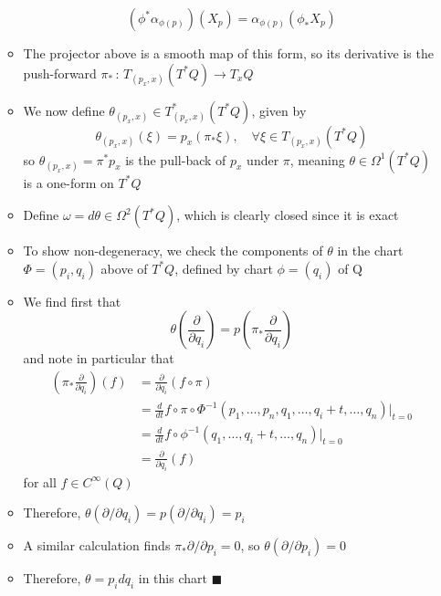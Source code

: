 \documentclass[12pt,a4paper]{article}
\numberwithin{equation}{section}
\begin{document}
\begin{itemize}
\begin{itemize}
			\begin{equation}
				(\phi^{*}\alpha_{\phi(p)})(X_{p})=\alpha_{\phi(p)}(\phi_{*}X_{p})
			\end{equation}
			\item The projector above is a smooth map of this form, so its derivative is the push-forward $\pi_{*}\,:\,T_{(p_{x},x)}(T^{*}Q)\to T_{x}Q$
			\item We now define $\theta_{(p_{x},x)}\in T^{*}_{(p_{x},x)}(T^{*}Q)$, given by
			\begin{equation}
				\theta_{(p_{x},x)}(\xi)=p_{x}(\pi_{*}\xi) ,\quad \forall \xi \in T_{(p_{x},x)}(T^{*}Q)
			\end{equation}
			so $\theta_{(p_{x},x)}=\pi^{*}p_{x}$ is the pull-back of $p_{x}$ under $\pi$, meaning $\theta\in \Omega^{1}(T^{*}Q)$ is a one-form on $T^{*}Q$
			\item Define $\omega = d\theta\in\Omega^{2}(T^{*}Q)$, which is clearly closed since it is exact
			\item To show non-degeneracy, we check the components of $\theta$ in the chart $\Phi=(p_{i},q_{i})$ above of $T^{*}Q$, defined by chart $\phi=(q_{i})$ of Q
			\item We find first that
			\begin{equation}
				\theta\left(\frac{\partial}{\partial q_{i}}\right)=p\left(\pi_{*}\frac{\partial}{\partial q_{i}}\right)
			\end{equation}
			and note in particular that
			\begin{equation}
				\begin{aligned}
					\left(\pi_{*}\frac{\partial}{\partial q_{i}}\right)(f)&=\frac{\partial}{\partial q_{i}}(f\circ\pi)\\&=\frac{d}{dt}f\circ\pi\circ\Phi^{-1}(p_{1},\ldots,p_{n},q_{1},\ldots,q_{i}+t,\ldots,q_{n})\vert_{t=0}\\&=\frac{d}{dt}f\circ\phi^{-1}(q_{1},\ldots,q_{i}+t,\ldots,q_{n})\vert_{t=0}\\&=\frac{\partial}{\partial q_{i}}(f)
				\end{aligned}
			\end{equation}
			for all $f\in C^{\infty}(Q)$
			\item Therefore, $\theta(\partial/\partial q_{i})=p(\partial/\partial q_{i})=p_{i}$
			\item A similar calculation finds $\pi_{*}\partial/\partial p_{i}=0$, so $\theta(\partial/\partial p_{i})=0$
			\item Therefore, $\theta=p_{i}dq_{i}$ in this chart $\blacksquare$

\end{itemize}
\end{itemize}
\end{document}
